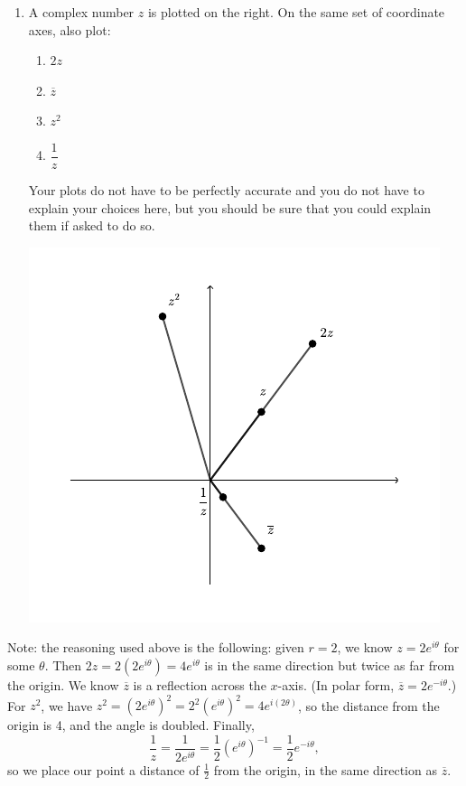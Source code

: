 \documentclass[12pt]{article}
\begin{document}
  \begin{multicols}{2}

  \begin{enumerate}
    \addtocounter{enumi}{1}
      \item A complex number $z$ is plotted on the right. On the same set of coordinate axes, also plot:
      \begin{multicols}{2}
      \begin{enumerate}
      \item $2z$
      \item $\overline{z}$
      \item $z^2$
      \item $\dfrac{1}{z}$
      \end{enumerate}
      \end{multicols}
      Your plots do not have to be perfectly accurate and you do not have to explain your choices here, but you should be sure that you could explain them if asked to do so.
      \begin{center}
      \includegraphics[width=0.8\columnwidth]{T1-2sol}
      \end{center}
  \end{enumerate}
\end{multicols}
Note: the reasoning used above is the following: given $r=2$, we know $z=2e^{i\theta}$ for some $\theta$. Then $2z=2(2e^{i\theta})=4e^{i\theta}$ is in the same direction but twice as far from the origin. We know $\overline{z}$ is a reflection across the $x$-axis. (In polar form, $\overline{z}=2e^{-i\theta}$.)
For $z^2$, we have $z^2=(2e^{i\theta})^2=2^2(e^{i\theta})^2=4e^{i(2\theta)}$, so the distance from the origin is 4, and the angle is doubled. Finally,
\[
\frac{1}{z} = \frac{1}{2e^{i\theta}}=\frac{1}{2}(e^{i\theta})^{-1}=\frac{1}{2}e^{-i\theta},
\]
so we place our point a distance of $\frac12$ from the origin, in the same direction as $\overline{z}$.
\end{document}
